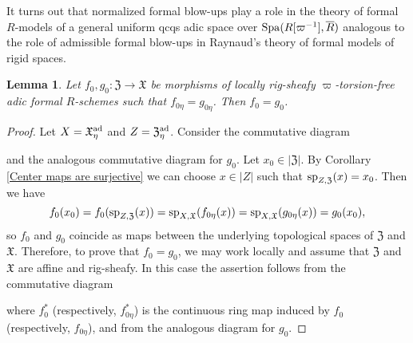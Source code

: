 \documentclass[12pt,twoside,a4paper]{article}
\newtheorem{lemma}[thm]{Lemma}
\theoremstyle{definition}
\theoremstyle{remark}
\newcommand\ad{{\rm ad}}
\newcommand\spc{{\rm sp}}
\newcommand\Spa{{\rm Spa}}
\begin{document}
It turns out that normalized formal blow-ups play a role in the theory of formal $R$-models of a general uniform qcqs adic space over $\Spa(R[\varpi^{-1}], \overline{R})$ analogous to the role of admissible formal blow-ups in Raynaud's theory of formal models of rigid spaces.  
\begin{lemma}\label{Faithfulness}Let $f_{0}, g_{0}: \mathfrak{Z}\to\mathfrak{X}$ be morphisms of locally rig-sheafy $\varpi$-torsion-free adic formal $R$-schemes such that $f_{0\eta}=g_{0\eta}$. Then $f_{0}=g_{0}$.\end{lemma}
\begin{proof}Let $X=\mathfrak{X}_{\eta}^{\ad}$ and $Z=\mathfrak{Z}_{\eta}^{\ad}$. Consider the commutative diagram \begin{center}\end{center}and the analogous commutative diagram for $g_{0}$. Let $x_{0}\in\vert\mathfrak{Z}\vert$. By Corollary \ref{Center maps are surjective} we can choose $x\in\vert Z\vert$ such that $\spc_{Z,\mathfrak{Z}}(x)=x_{0}$. Then we have \begin{equation*}f_{0}(x_{0})=f_{0}(\spc_{Z,\mathfrak{Z}}(x))=\spc_{X,\mathfrak{X}}(f_{0\eta}(x))=\spc_{X,\mathfrak{X}}(g_{0\eta}(x))=g_{0}(x_{0}),\end{equation*}so $f_{0}$ and $g_{0}$ coincide as maps between the underlying topological spaces of $\mathfrak{Z}$ and $\mathfrak{X}$. Therefore, to prove that $f_{0}=g_{0}$, we may work locally and assume that $\mathfrak{Z}$ and $\mathfrak{X}$ are affine and rig-sheafy. In this case the assertion follows from the commutative diagram \begin{center}\end{center}where $f_{0}^{\ast}$ (respectively, $f_{0\eta}^{\ast}$) is the continuous ring map induced by $f_{0}$ (respectively, $f_{0\eta}$), and from the analogous diagram for $g_{0}$.\end{proof}
\end{document}
